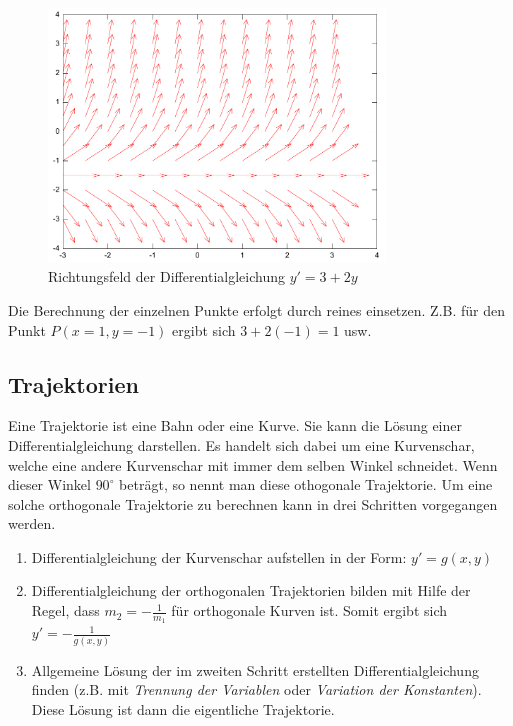 \begin{figure}[h!]
	\centering
	\includegraphics[width=0.8\textwidth]{../fig/field.pdf}
	\caption{Richtungsfeld der Differentialgleichung $y'=3+2y$}
\end{figure}

\noindent
Die Berechnung der einzelnen Punkte erfolgt durch reines einsetzen.
Z.B. für den Punkt $P(x=1, y=-1)$ ergibt sich $3+2(-1)=1$ usw.

\subsection{Trajektorien}
Eine Trajektorie ist eine Bahn oder eine Kurve. Sie kann die Lösung einer 
Differentialgleichung darstellen. Es handelt sich dabei um eine Kurvenschar, 
welche eine andere Kurvenschar mit immer dem selben Winkel schneidet. Wenn 
dieser Winkel $90^{\circ}$ beträgt, so nennt man diese othogonale Trajektorie.
Um eine solche orthogonale Trajektorie zu berechnen kann in drei Schritten
vorgegangen werden.
\begin{enumerate}
  \item Differentialgleichung der Kurvenschar aufstellen in der Form: 
	$y'=g(x,y)$
  \item Differentialgleichung der orthogonalen Trajektorien bilden
	mit Hilfe der Regel, dass $m_2=-\frac{1}{m_1}$ für orthogonale
	Kurven ist. Somit ergibt sich $y'=-\frac{1}{g(x,y)}$
  \item Allgemeine Lösung der im zweiten Schritt erstellten
	Differentialgleichung finden (z.B. mit \emph{Trennung der Variablen}
	oder \emph{Variation der Konstanten}). Diese Lösung ist dann die 
	eigentliche Trajektorie.
\end{enumerate}

